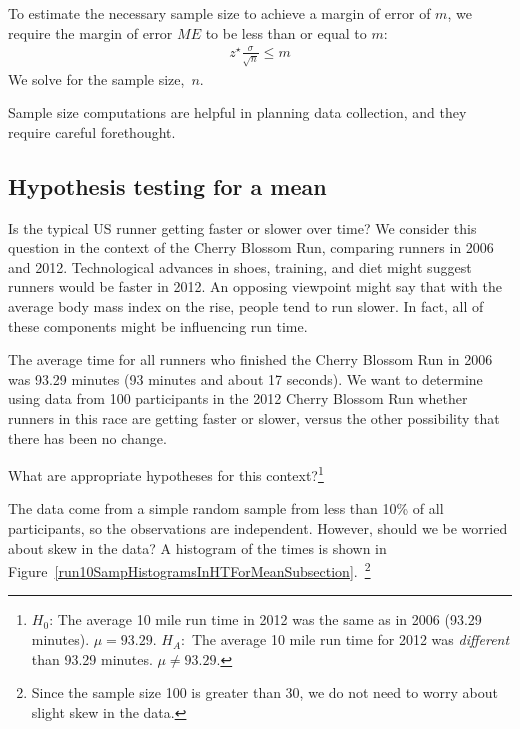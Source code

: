 \begin{termBox}{
To estimate the necessary sample size to achieve a margin of error of $m$, we require the margin of error $ME$ to be less than or equal to $m$:
\begin{align*}
z^{\star}\frac{\sigma}{\sqrt{n}}\leq m
\end{align*}
We solve for the sample size,~$n$.}
\end{termBox}

Sample size computations are helpful in planning data collection, and they require careful forethought. 



\textA{\newpage}

\subsection{Hypothesis testing for a mean}
\label{oneSampleTTests}


Is the typical US runner getting faster or slower over time? We consider this question in the context of the Cherry Blossom Run, comparing runners in 2006 and 2012. Technological advances in shoes, training, and diet might suggest runners would be faster in 2012. An opposing viewpoint might say that with the average body mass index on the rise, people tend to run slower. In fact, all of these components might be influencing run time.

The average time for all runners who finished the Cherry Blossom Run in 2006 was 93.29 minutes (93 minutes and about 17 seconds). We want to determine using data from 100 participants in the 2012 Cherry Blossom Run whether runners in this race are getting faster or slower, versus the other possibility that there has been no change.

\begin{exercise}
What are appropriate hypotheses for this context?\footnote{$H_0$: The average 10 mile run time in 2012 was the same as in 2006 (93.29 minutes). $\mu = 93.29$. $H_A$:~The average 10 mile run time for 2012 was \emph{different} than 93.29 minutes. $\mu \neq 93.29$.}
\end{exercise}

\begin{exercise}
The data come from a simple random sample from less than 10\% of all participants, so the observations are independent. However, should we be worried about skew in the data? A histogram of the times is shown in Figure~\ref{run10SampHistogramsInHTForMeanSubsection}.~\footnote{Since the sample size 100 is greater than 30, we do not need to worry about slight skew in the data.}
\end{exercise}

